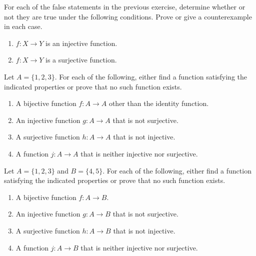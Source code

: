 \begin{exercise}
For each of the false statements in the previous exercise, determine whether or not they are true under the following conditions.  Prove or give a counterexample in each case.
\begin{enumerate}
\item $f:X\to Y$ is an injective function.
\item $f:X\to Y$ is a surjective function.
\end{enumerate}
\end{exercise}

\begin{exercise}\label{exer:bijections}
Let $A=\{1,2,3\}$.  For each of the following, either find a function satisfying the indicated properties or prove that no such function exists.
\begin{enumerate}
\item A bijective function $f:A\to A$ other than the identity function.

\item\label{bijections:injective}\markit An injective function $g:A\to A$ that is not surjective.
\item A surjective function $h:A\to A$ that is not injective.

\item A function $j:A\to A$ that is neither injective nor surjective.
\end{enumerate}
\end{exercise}

\begin{exercise}
Let $A=\{1,2,3\}$ and $B=\{4,5\}$.  For each of the following, either find a function satisfying the indicated properties or prove that no such function exists.
\begin{enumerate}
\item A bijective function $f:A\to B$.

\item An injective function $g:A\to B$ that is not surjective.

\item A surjective function $h:A\to B$ that is not injective.

\item A function $j:A\to B$ that is neither injective nor surjective.
\end{enumerate}
\end{exercise}


